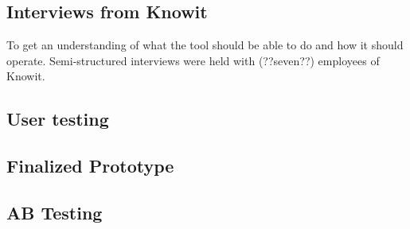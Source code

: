 \subsection{Interviews from Knowit}%
\label{sub:}
To get an understanding of what the tool should be able to do and how it should operate. Semi-structured interviews were held with (??seven??) employees of Knowit.

\subsection{User testing}%
\label{sub:userTesting}

\subsection{ Finalized Prototype }%
\label{sub:finalizingPrototype}

\subsection{ AB Testing }%
\label{sub:mABTesting}
